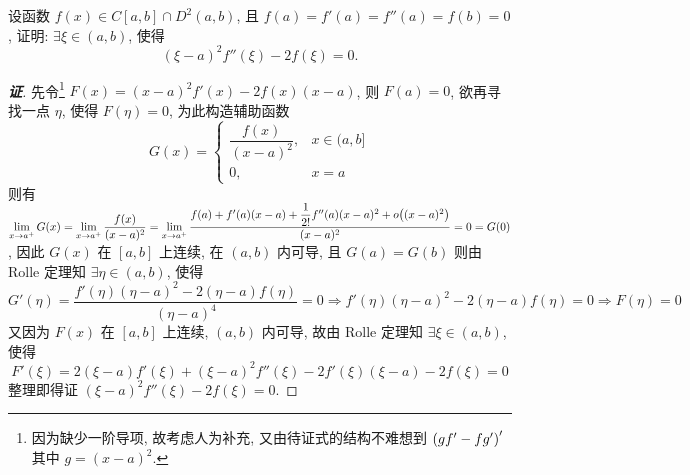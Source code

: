 \begin{example}
    设函数 $f(x)\in C[a,b]\cap D^2(a,b)$, 且 $f(a)=f'(a)=f''(a)=f(b)=0$, 证明: $\exists \xi\in(a,b)$, 使得 $$(\xi-a)^2f''(\xi)-2f(\xi)=0.$$
\end{example}
\begin{proof}[{\songti \textbf{证}}]
    先令\footnote{因为缺少一阶导项, 故考虑人为补充, 又由待证式的结构不难想到 $\qty(gf'-fg')'$ 其中 $g=(x-a)^2$.} $F(x)=(x-a)^2f'(x)-2f(x)(x-a)$, 则 $F(a)=0$, 欲再寻找一点 $\eta$, 使得 $F(\eta)=0$, 为此构造辅助函数
    $$G(x)=\begin{cases}
            \dfrac{f(x)}{(x-a)^2}, & x\in(a,b] \\
            0,                     & x=a
        \end{cases}$$
    则有 $\displaystyle\lim_{x\to a^+}G(x)=\lim_{x\to a^+}\dfrac{f(x)}{(x-a)^2} =\lim_{x\to a^+}\dfrac{f(a)+f'(a)(x-a)+\dfrac{1}{2!}f''(a)(x-a)^2+o\qty((x-a)^2)}{(x-a)^2}=0=G(0)$, 
    因此 $G(x)$ 在 $[a,b]$ 上连续, 在 $(a,b)$ 内可导, 且 $G(a)=G(b)$ 则由 Rolle 定理知
    $\exists\eta\in(a,b)$, 使得 $$G'(\eta)=\dfrac{f'(\eta)(\eta-a)^2-2(\eta-a)f(\eta)}{(\eta-a)^4}=0\Rightarrow f'(\eta)(\eta-a)^2-2(\eta-a)f(\eta)=0\Rightarrow F(\eta)=0$$
    又因为 $F(x)$ 在 $[a,b]$ 上连续, $(a,b)$ 内可导, 故由 Rolle 定理知 $\exists\xi\in(a,b)$, 使得 $$F'(\xi)=2(\xi-a)f'(\xi)+(\xi-a)^2f''(\xi)-2f'(\xi)(\xi-a)-2f(\xi)=0$$
    整理即得证 $(\xi-a)^2f''(\xi)-2f(\xi)=0.$
\end{proof}
